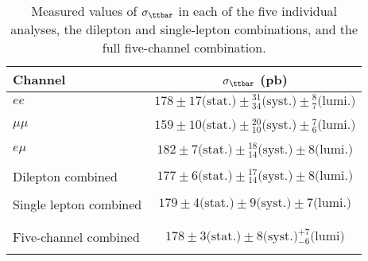 


\begin{table}[htdp]
  \begin{center}
    \begin{tabular}{|l|c|}\hline
      Channel & $\sigma_{\ttbar}$ (pb) \\ \hline
      $ee$      & $178 \pm 17  \textrm{(stat.)} \pm {}^{31}_{34}
       \textrm{(syst.)} \pm {}^{8}_{7} \textrm{(lumi.)}$
      \\ & \\
      $\mu\mu$  & $159 \pm 10 \textrm{(stat.)} 
      \pm {}^{20}_{10} \textrm{(syst.)} \pm {}^{7}_{6} \textrm{(lumi.)}$ 
      \\ & \\
      $e\mu$    & $182 \pm 7  \textrm{(stat.)} \pm {}^{18}_{14} \textrm{(syst.)} 
      \pm 8 \textrm{(lumi.)}$
      \\\hline
      & \\
      Dilepton combined & $177 \pm 6 \textrm{(stat.)} \pm {}^{17}_{14}
      \textrm{(syst.)} \pm 8 \textrm{(lumi.)}
      $\\
      & \\\hline
      Single lepton combined & $179 \pm 4  \textrm{(stat.)} \pm 9 \textrm{(syst.)} \pm 7 \textrm{(lumi.)}$ \\
      & \\ \hline \hline
      & \\
      Five-channel combined & $178 \pm 3 \textrm{(stat.)} \pm 8 \textrm{(syst.)} {}^{+7}_{-6} \textrm{(lumi})$\\
      & \\ \hline
    \end{tabular}
  \end{center}
  \caption{\label{tab:results}
    Measured values of $\sigma_{\ttbar}$ in each of the five individual analyses, the dilepton and single-lepton combinations, and the full five-channel combination.  
  }

\end{table}
